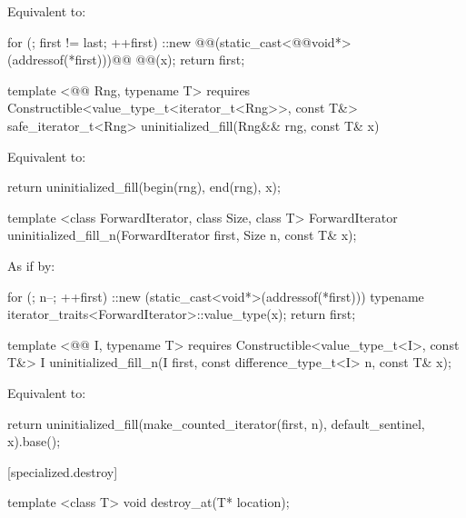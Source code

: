 \pnum
\effects Equivalent to:
\begin{codeblock}
    for (; first != last; ++first) {
      ::new @@(static_cast<@@void*>(addressof(*first)))@\added{)}@
        @@(x);
    }
    return first;
\end{codeblock}

{\color{addclr}
\begin{codeblock}
template <@@ Rng, typename T>
requires
  Constructible<value_type_t<iterator_t<Rng>>, const T&>
safe_iterator_t<Rng> uninitialized_fill(Rng&& rng, const T& x)
\end{codeblock}

\pnum
\effects Equivalent to:
\begin{codeblock}
    return uninitialized_fill(begin(rng), end(rng), x);
\end{codeblock}
} %

{\color{remclr}
\begin{codeblock}
template <class ForwardIterator, class Size, class T>
  ForwardIterator uninitialized_fill_n(ForwardIterator first, Size n, const T& x);
\end{codeblock}

\setcounter{Paras}{1}
\pnum
\effects As if by:
\begin{codeblock}
        for (; n--; ++first)
          ::new (static_cast<void*>(addressof(*first)))
            typename iterator_traits<ForwardIterator>::value_type(x);
        return first;
\end{codeblock}
} %

{\color{addclr}
\begin{codeblock}
template <@@ I, typename T>
requires
  Constructible<value_type_t<I>, const T&>
I uninitialized_fill_n(I first, const difference_type_t<I> n, const T& x);
\end{codeblock}

\setcounter{Paras}{3}
\pnum
\effects Equivalent to:
\begin{codeblock}
    return uninitialized_fill(make_counted_iterator(first, n), default_sentinel{}, x).base();
\end{codeblock}
} %

[specialized.destroy]{}
{\color{remclr}
\begin{codeblock}
template <class T>
  void destroy_at(T* location);
\end{codeblock}
} %

